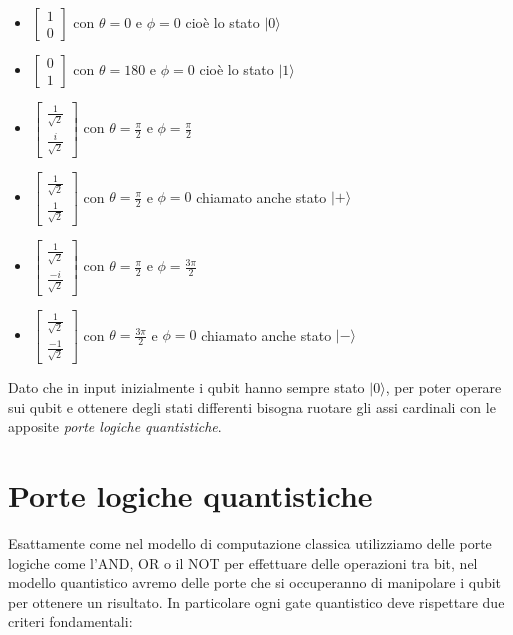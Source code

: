 \begin{itemize}
  \item \( \begin{bmatrix} 1 \\ 0 \end{bmatrix} \) con \( \theta = 0 \) e \(\phi = 0\) cioè lo stato \( | 0 \rangle \)
  \item \( \begin{bmatrix} 0 \\ 1 \end{bmatrix} \) con \( \theta = 180 \) e \(\phi = 0\) cioè lo stato \( | 1 \rangle \)
  \item \( \begin{bmatrix} \frac{1}{\sqrt{2}} \\ \frac{i}{\sqrt{2}} \end{bmatrix} \) con \( \theta = \frac{\pi}{2} \) e \( \phi = \frac{\pi}{2} \)
  \item \( \begin{bmatrix} \frac{1}{\sqrt{2}} \\ \frac{1}{\sqrt{2}} \end{bmatrix} \) con \( \theta = \frac{\pi}{2} \) e \( \phi = 0 \) chiamato anche stato \( | + \rangle \)
  \item \( \begin{bmatrix} \frac{1}{\sqrt{2}} \\ \frac{-i}{\sqrt{2}} \end{bmatrix} \) con \( \theta = \frac{\pi}{2} \) e \( \phi = \frac{3\pi}{2} \)
  \item \( \begin{bmatrix} \frac{1}{\sqrt{2}} \\ \frac{-1}{\sqrt{2}} \end{bmatrix} \) con \( \theta = \frac{3\pi}{2} \) e \( \phi = 0 \) chiamato anche stato \( | - \rangle \)
\end{itemize}

Dato che in input inizialmente i qubit hanno sempre stato \( | 0 \rangle \), per poter operare sui qubit e ottenere degli stati differenti bisogna ruotare gli assi cardinali con le apposite \textit{porte logiche quantistiche}.

\section{Porte logiche quantistiche}
Esattamente come nel modello di computazione classica utilizziamo delle porte logiche come l'AND, OR o il NOT per effettuare delle operazioni tra bit, nel modello quantistico avremo delle porte che si occuperanno di manipolare i qubit per ottenere un risultato. In particolare ogni gate quantistico deve rispettare due criteri fondamentali:

